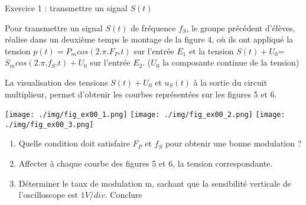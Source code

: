 \documentclass[12pt, french]{article}
\begin{document}
\begin{center}

\vspace{-2cm}
\end{center}

\vspace{-0.5cm}
   \begin{Box2}{Exercice 1 : transmettre un signal $S(t)$ }

Pour transmettre un signal $S(t)$ de fréquence $f_S$, le groupe précédent
d’élèves, réalise dans un deuxième temps le montage de la figure 4, où ils ont
appliqué la tension $p(t) = P_mcos(2.\pi.F_P.t)$ sur l’entrée $E_1$ et la tension
$S(t) + U_0$=$S_mcos(2.\pi.f_S.t) + U_0$ sur l’entrée $E_2$. ($U_0$ la composante continue de la tension)

La visualisation des tensions $S(t) + U_0$ et $u_{S}(t)$ à la sortie du circuit
multiplieur, permet d’obtenir les courbes représentées sur les figures 5 et 6.
  \begin{center}
	  \vspace{-0.6cm}
	\texttt{[image: ./img/fig\_ex00\_1.png]}
	\texttt{[image: ./img/fig\_ex00\_2.png]}
	\texttt{[image: ./img/fig\_ex00\_3.png]}
  \end{center}
\begin{enumerate}
	\item Quelle condition doit satisfaire
$F_P$ et $f_S$ pour obtenir une bonne
modulation ?
\item Affecter à chaque courbe des
figures 5 et 6, la tension
correspondante.

\item Déterminer le taux de modulation m, sachant que la sensibilité  verticale de l’oscilloscope est $1 V/div$. Conclure
\end{enumerate}


   \end{Box2}
\end{document}
